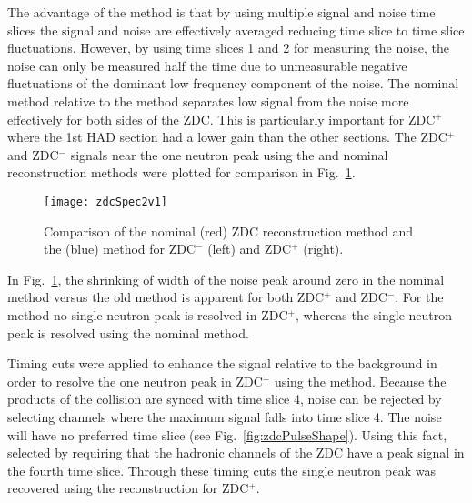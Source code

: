       The advantage of the \DIFdelbegin {}\DIFdelend \DIFaddbegin {}\DIFaddend method is that by using multiple signal
        and noise time slices the signal and noise are effectively averaged
        reducing time slice to time slice fluctuations.
      However, by using time slices 1 and 2 for measuring the noise, the noise
        can only be measured half the time due to unmeasurable negative 
        fluctuations of the dominant low frequency component of the noise.
      The nominal method relative to the \DIFdelbegin {}\DIFdelend \DIFaddbegin {}\DIFaddend method separates low signal
        from the noise more effectively  for both sides of the ZDC.
      This is particularly important for ZDC$^{+}$ where the 1st HAD section
        had a lower gain than the other sections. 
      The ZDC$^{+}$ and ZDC$^{-}$ signals near the one neutron peak using the
        \DIFdelbegin {}\DIFdelend \DIFaddbegin {}\DIFaddend and nominal reconstruction methods were plotted for comparison in 
        Fig.~\ref{fig:zdcSpec2v1}.
      \begin{figure}[h]
        \centering
        \texttt{[image: zdcSpec2v1]}
        \caption{Comparison of the nominal (red) ZDC reconstruction 
          method and the \DIFdelbeginFL {}\DIFdelendFL \DIFaddbeginFL {}\DIFaddendFL (blue) method for ZDC$^{-}$ (left) and 
          ZDC$^{+}$ (right).}
        \label{fig:zdcSpec2v1}
      \end{figure}
      In Fig.~\ref{fig:zdcSpec2v1}, the shrinking of width of the noise peak 
        around zero in the nominal method versus the old method is apparent for
        both ZDC$^{+}$ and ZDC$^{-}$.
      For the \DIFdelbegin {}\DIFdelend \DIFaddbegin {}\DIFaddend method no single neutron peak is resolved in ZDC$^{+}$,
        whereas the single neutron peak is resolved using the nominal method. 

      Timing cuts were applied to enhance the signal relative to the background
        in order to resolve the one neutron peak in ZDC$^{+}$ using the 
        \DIFdelbegin {}\DIFdelend \DIFaddbegin {}\DIFaddend method. 
      Because the products of the collision are synced with time slice 4, noise
        can be rejected by selecting channels where the maximum signal falls 
        into time slice 4.
      The noise will have no preferred time slice (see Fig.~\ref{fig:zdcPulseShape}). 
      Using this fact, \DIFdelbegin {}\DIFdelend \DIFaddbegin {}\DIFaddend selected by requiring that the
        hadronic channels of the ZDC have a peak signal in the fourth time 
        slice.
      Through these timing cuts the single neutron peak was recovered using the
       \DIFdelbegin {}\DIFdelend \DIFaddbegin {}\DIFaddend reconstruction for ZDC$^{+}$.

